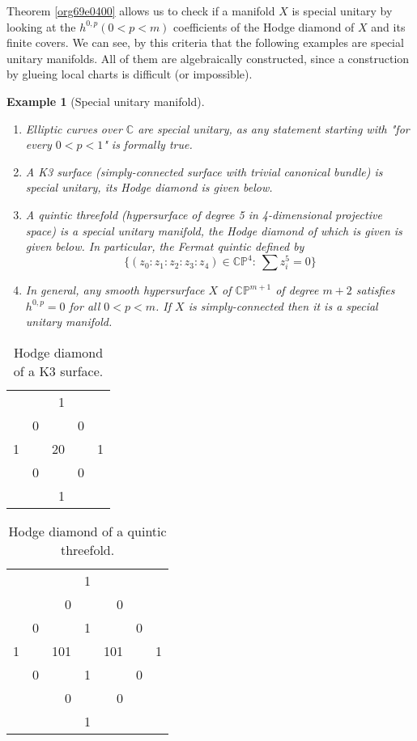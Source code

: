 \documentclass[11pt]{article}
\newtheorem{exampl}{Example}
\begin{document}
Theorem \ref{org69e0400} allows us to check if a manifold \(X\) is special unitary by looking at the
\(h^{0,p} (0<p<m)\) coefficients of the Hodge diamond of \(X\) and its finite covers. We can see, by
this criteria that the following examples are special unitary manifolds. All of them are algebraically
constructed, since a construction by glueing local charts is difficult (or impossible).

\begin{exampl}[Special unitary manifold]
\begin{enumerate}
\item Elliptic curves over \(\mathbb{C}\) are special unitary, as any statement starting with "for every \(0<p<1\)" is
formally true.
\item A K3 surface (simply-connected surface with trivial canonical bundle) is special
unitary, its Hodge diamond is given below.
\item A quintic threefold (hypersurface of degree 5 in 4-dimensional projective space) is a special
unitary manifold, the Hodge diamond of which is given is given below. In particular, the Fermat
quintic defined by \[\{(z_0:z_1:z_2:z_3:z_4) \in \mathbb{C}\mathbb{P}^{4}:\ \sum z_i^5 =0 \}\]
\item In general, any smooth hypersurface \(X\) of \(\mathbb{C}\mathbb{P}^{m+1}\) of degree \(m+2\) satisfies \(h^{0,p}=0\)
for all \(0<p<m\). If \(X\) is simply-connected then it is a special unitary manifold.
\end{enumerate}
\end{exampl}


\begin{table}[htbp]
\caption{Hodge diamond of a K3 surface.}
\centering
\begin{tabular}{rrrrr}
 &  & 1 &  & \\
 & 0 &  & 0 & \\
1 &  & 20 &  & 1\\
 & 0 &  & 0 & \\
 &  & 1 &  & \\
\end{tabular}
\end{table}

\begin{table}[htbp]
\caption{Hodge diamond of a quintic threefold.}
\centering
\begin{tabular}{rrrrrrr}
 &  &  & 1 &  &  & \\
 &  & 0 &  & 0 &  & \\
 & 0 &  & 1 &  & 0 & \\
1 &  & 101 &  & 101 &  & 1\\
 & 0 &  & 1 &  & 0 & \\
 &  & 0 &  & 0 &  & \\
 &  &  & 1 &  &  & \\
\end{tabular}
\end{table}
\end{document}
